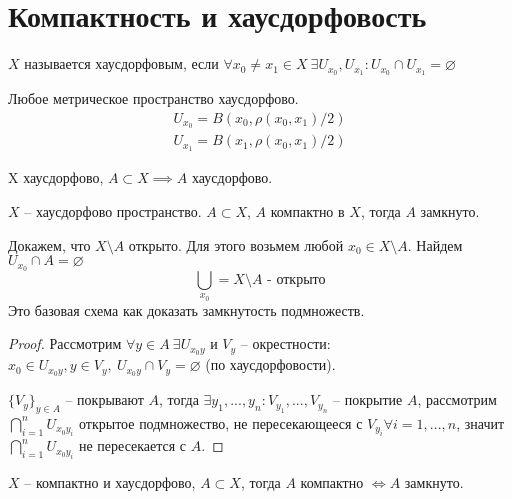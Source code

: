 \documentclass[main]{subfiles}
\begin{document}
\section{Компактность и хаусдорфовость}
\begin{axiom}[Хаусдорфа]
    $X$ называется хаусдорфовым, если $\forall x_0 \neq x_1 \in X\ \exists U_{x_0}, U_{x_1} : U_{x_0} \cap U_{x_1} = \varnothing$
\end{axiom}
\begin{example}
    Любое метрическое пространство хаусдорфово.
    \begin{gather*}
        U_{x_0} = B(x_0, \rho(x_0, x_1) /2)\\
        U_{x_1} = B(x_1, \rho(x_0, x_1) /2)
    \end{gather*}
\end{example}
\begin{remark}
    X хаусдорфово, $A \subset X \implies A$ хаусдорфово.
\end{remark}

\begin{theorem}\label{compact:4}
    $X$ -- хаусдорфово пространство. $A \subset X$, $A$ компактно в $X$, тогда $A$ замкнуто.
\end{theorem}
\begin{remark}
    Докажем, что $X \setminus A$ открыто.
    Для этого возьмем любой $x_0 \in X \setminus A$. Найдем $U_{x_0} \cap A = \varnothing$
    \[\bigcup_{x_0} = X \setminus A \text{ - открыто}\]
    Это базовая схема как доказать замкнутость подмножеств.
\end{remark}
\begin{proof}
    Рассмотрим $\forall y \in A \ \exists U_{x_0 y}$ и $V_y$ -- окрестности:
    $x_0 \in U_{x_0y}, y \in V_y, \ U_{x_0y} \cap V_y = \varnothing$ (по хаусдорфовости).

    $\{V_y\}_{y \in A}$ -- покрывают $A$, тогда $\exists y_1, ..., y_n: V_{y_1}, ..., V_{y_n}$ -- покрытие $A$,
    рассмотрим $\bigcap_{i=1}^n U_{x_0 y_i}$ открытое подмножество, не пересекающееся с $V_{y_i} \forall i = 1, ..., n$,
    значит $\bigcap_{i = 1}^n U_{x_0y_i}$ не пересекается с $A$.
\end{proof}

\begin{corollary}
    $X$ -- компактно и хаусдорфово, $A \subset X$, тогда $A$ компактно $\Leftrightarrow A$ замкнуто.
\end{corollary}
\end{document}
